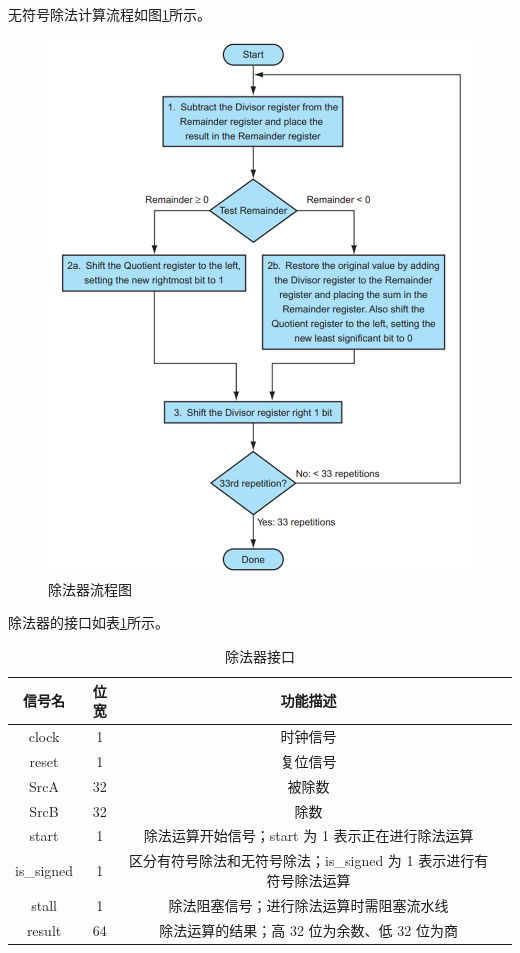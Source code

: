 无符号除法计算流程如图\ref{fig:除法器流程图}所示。

\begin{figure}
    \centering
    \includegraphics[width=1\linewidth]{image/除法器流程图.png}
    \caption{除法器流程图}
    \label{fig:除法器流程图}
\end{figure}

除法器的接口如表\ref{除法器接口}所示。

\begin{table}[h]
\centering
\begin{tabular}{|c|c|c|c|}
\hline
\textbf{信号名}  & \textbf{位宽} & \textbf{功能描述}\\ \hline 
clock &  1 & 时钟信号 \\ \hline
reset & 1 & 复位信号 \\ \hline
SrcA & 32 & 被除数 \\ \hline
SrcB & 32 & 除数 \\ \hline
start & 1 & 除法运算开始信号；start 为 1 表示正在进行除法运算 \\ \hline
is\_signed & 1 & 区分有符号除法和无符号除法；is\_signed 为 1 表示进行有符号除法运算 \\ \hline
stall &  1 & 除法阻塞信号；进行除法运算时需阻塞流水线 \\ \hline
result & 64 & 除法运算的结果；高 32 位为余数、低 32 位为商 \\ \hline
\end{tabular}
\caption{除法器接口}
\label{除法器接口}
\end{table}


